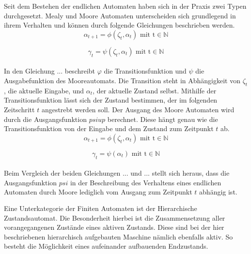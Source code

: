 	Seit dem Bestehen der endlichen Automaten haben sich in der Praxis zwei Typen durchgesetzt. Mealy und Moore Automaten unterscheiden sich grundlegend in ihrem Verhalten und können durch folgende Gleichungen beschrieben werden.\\
	
	\begin{equation}
		\alpha_{t+1}=\phi(\zeta_t,\alpha_t)\text{    mit    t}\in\mathbb{N}
		\label{eq: transferfct}
	\end{equation}

	\begin{equation}
		\gamma_t=\psi(\zeta_t,\alpha_t)\text{    mit    t}\in\mathbb{N}
		\label{eq: transferfct}
	\end{equation}
	\\
	In den Gleichung ... beschreibt $\varphi$ die Transitionsfunktion und $\psi$ die Ausgabefunktion des Mooreautomats. Die Transition steht in Abhängigkeit von $\zeta_t $, die aktuelle Eingabe, und $\alpha_t$, der aktuelle Zustand selbst. Mithilfe der Transitionsfunktion lässt sich der Zustand bestimmen, der im folgenden Zeitschritt $t$ angestrebt werden soll. Der Ausgang des Moore Automaten wird durch die Ausgangsfunktion $psiup$ berechnet. Diese hängt genau wie die Transitionsfunktion von der Eingabe und dem Zustand zum Zeitpunkt $t$ ab. \\
	
	\begin{equation}
		\alpha_{t+1}=\phi(\zeta_t,\alpha_t)\text{    mit    t}\in\mathbb{N}
		\label{eq: transferfct}
	\end{equation}
	
	\begin{equation}
		\gamma_t=\psi(\alpha_t)\text{    mit    t}\in\mathbb{N}
		\label{eq: transferfct}
	\end{equation}
	\\
	
	Beim Vergleich der beiden Gleichungen ... und ... stellt sich heraus, dass die Ausgangsfunktion $psi$ in der Beschreibung des Verhaltens eines endlichen Automaten durch Moore lediglich vom Ausgang zum Zeitpunkt $t$ abhängig ist.
	
	Eine Unterkategorie der Finiten Automaten ist der Hierarchische Zustandsautomat. Die Besonderheit hierbei ist die Zusammensetzung aller vorangegangenen Zustände eines aktiven Zustands. Diese sind bei der hier beschriebenen hierarchisch aufgebauten Maschine nämlich ebenfalls aktiv. So besteht die Möglichkeit eines aufeinander aufbauenden Endzustands. 
	
